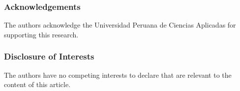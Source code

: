 \documentclass[runningheads]{llncs}
\title{\PaperTitle}
\author{\AuthorOne\inst{1}\orcidID{\AuthorOneOrcid}
\and \AuthorTwo\inst{1}\orcidID{\AuthorTwoOrcid}
\and \AuthorThree\inst{1}\orcidID{\AuthorThreeOrcid}}
\institute{\PaperInstitute}
\begin{document}
\maketitle

\begin{abstract}


\end{abstract}



\begin{credits}
\subsubsection{Acknowledgements}
The authors acknowledge the Universidad Peruana de Ciencias Aplicadas for
supporting this research.

\subsubsection{Disclosure of Interests}
The authors have no competing interests to declare that are relevant to the
content of this article.
\end{credits}



\end{document}
